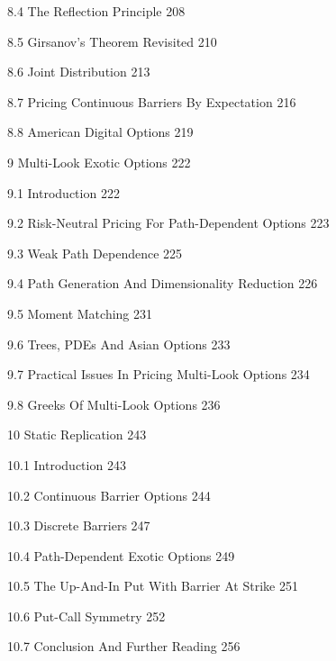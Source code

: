 8.4 The Reflection Principle 208



8.5 Girsanov's Theorem Revisited 210



8.6 Joint Distribution 213



8.7 Pricing Continuous Barriers By Expectation 216



8.8 American Digital Options 219



9 Multi-Look Exotic Options 222



9.1 Introduction 222



9.2 Risk-Neutral Pricing For Path-Dependent Options 223



9.3 Weak Path Dependence 225



9.4 Path Generation And Dimensionality Reduction 226



9.5 Moment Matching 231



9.6 Trees, PDEs And Asian Options 233



9.7 Practical Issues In Pricing Multi-Look Options 234



9.8 Greeks Of Multi-Look Options 236



10 Static Replication 243



10.1 Introduction 243



10.2 Continuous Barrier Options 244



10.3 Discrete Barriers 247



10.4 Path-Dependent Exotic Options 249



10.5 The Up-And-In Put With Barrier At Strike 251



10.6 Put-Call Symmetry 252



10.7 Conclusion And Further Reading 256




